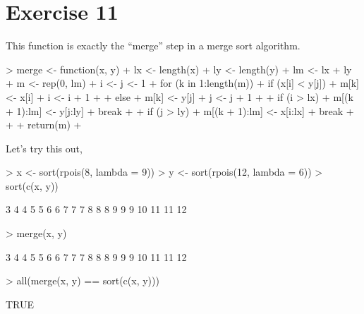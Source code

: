 \documentclass{article}
\begin{document}
\section{Exercise 11}
This function is exactly the ``merge'' step in a merge sort algorithm. 
\begin{Schunk}
\begin{Sinput}
> merge <- function(x, y) {
+     lx <- length(x)
+     ly <- length(y)
+     lm <- lx + ly
+     m <- rep(0, lm)
+     i <- j <- 1
+     for (k in 1:length(m)) {
+         if (x[i] < y[j]) {
+             m[k] <- x[i]
+             i <- i + 1
+         }
+         else {
+             m[k] <- y[j]
+             j <- j + 1
+         }
+         if (i > lx) {
+             m[(k + 1):lm] <- y[j:ly]
+             break
+         }
+         if (j > ly) {
+             m[(k + 1):lm] <- x[i:lx]
+             break
+         }
+     }
+     return(m)
+ }
\end{Sinput}
\end{Schunk}
Let's try this out,
\begin{Schunk}
\begin{Sinput}
> x <- sort(rpois(8, lambda = 9))
> y <- sort(rpois(12, lambda = 6))
> sort(c(x, y))
\end{Sinput}
\begin{Soutput}
 [1]  3  4  4  5  5  6  6  7  7  7  8  8  8  9  9  9 10 11 11 12
\end{Soutput}
\begin{Sinput}
> merge(x, y)
\end{Sinput}
\begin{Soutput}
 [1]  3  4  4  5  5  6  6  7  7  7  8  8  8  9  9  9 10 11 11 12
\end{Soutput}
\begin{Sinput}
> all(merge(x, y) == sort(c(x, y)))
\end{Sinput}
\begin{Soutput}
[1] TRUE
\end{Soutput}
\end{Schunk}
\end{document}
